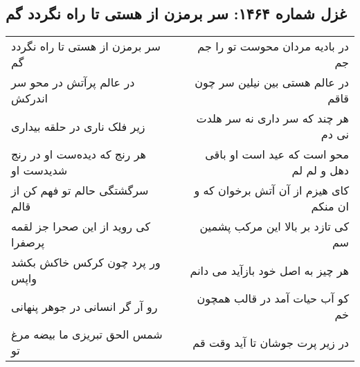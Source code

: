 \begin{center}
\section*{غزل شماره ۱۴۶۴: سر برمزن از هستی تا راه نگردد گم}
\label{sec:1464}
\begin{longtable}{l p{0.5cm} r}
سر برمزن از هستی تا راه نگردد گم
&&
در بادیه مردان محوست تو را جم جم
\\
در عالم پرآتش در محو سر اندرکش
&&
در عالم هستی بین نیلین سر چون قاقم
\\
زیر فلک ناری در حلقه بیداری
&&
هر چند که سر داری نه سر هلدت نی دم
\\
هر رنج که دیده‌ست او در رنج شدیدست او
&&
محو است که عید است او باقی دهل و لم لم
\\
سرگشتگی حالم تو فهم کن از قالم
&&
کای هیزم از آن آتش برخوان که و ان منکم
\\
کی روید از این صحرا جز لقمه پرصفرا
&&
کی تازد بر بالا این مرکب پشمین سم
\\
ور پرد چون کرکس خاکش بکشد واپس
&&
هر چیز به اصل خود بازآید می دانم
\\
رو آر گر انسانی در جوهر پنهانی
&&
کو آب حیات آمد در قالب همچون خم
\\
شمس الحق تبریزی ما بیضه مرغ تو
&&
در زیر پرت جوشان تا آید وقت قم
\\
\end{longtable}
\end{center}
